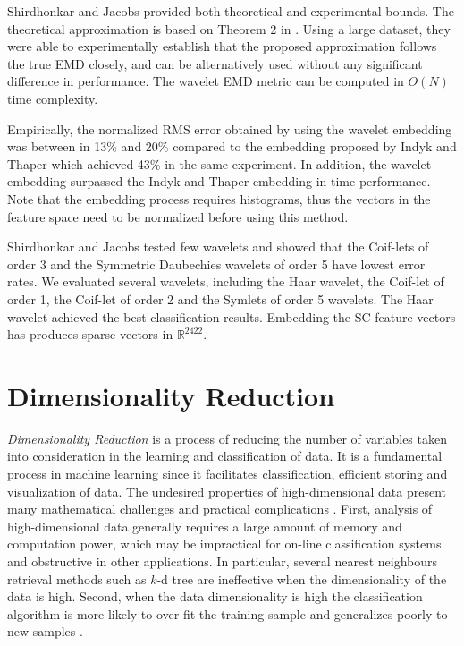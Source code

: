 \iftoggle{edit-mode}{\hspace{0pt}\marginpar{shirdhonkar - theoretical and empirical bounds}}{}
Shirdhonkar and Jacobs provided both theoretical and experimental bounds. 
The theoretical approximation is based on Theorem 2 in \cite{shirdhonkar2008approximate}. 
Using a large dataset, they were able to experimentally establish that the proposed approximation follows the true EMD closely, and can be alternatively used without any significant difference in performance. 
The wavelet EMD metric can be computed in $O\left( N \right)$ time complexity. 

\iftoggle{edit-mode}{\hspace{0pt}\marginpar{Performance - Indyk vs. shirdhonkar}}{}
Empirically, the normalized RMS error obtained by using the wavelet embedding was between in 13\% and 20\% compared to the embedding proposed by Indyk and Thaper which achieved 43\% in the same experiment. 
In addition, the wavelet embedding surpassed the Indyk and Thaper embedding in time performance.
Note that the embedding process requires histograms, thus the vectors in the feature space need to be normalized before using this method.

Shirdhonkar and Jacobs tested few wavelets and showed that the Coif-lets of order 3 and the Symmetric Daubechies wavelets of order 5 have lowest error rates. 
We evaluated several wavelets, including the Haar wavelet, the Coif-let of order 1, the Coif-let of order 2 and the Symlets of order 5 wavelets.
The Haar wavelet achieved the best classification results.
Embedding the SC feature vectors has produces sparse vectors in $\mathds{R}^2422$.

 
\newpage{}

\section{Dimensionality Reduction}
\label{sec:dr}

\iftoggle{edit-mode}{\hspace{0pt}\marginpar{What is DR and what techniques are there?}}{}
\emph{Dimensionality Reduction} is a process of reducing the number of variables taken into consideration in the learning and classification of data. 
It is a fundamental process in machine learning since it facilitates classification, efficient storing and visualization of data. 
The undesired properties of high-dimensional data present many mathematical challenges and practical complications \cite{van2009dimensionality}. 
First, analysis of high-dimensional data generally requires a large amount of memory and computation power, which may be impractical for on-line classification systems and obstructive in other applications. 
In particular, several nearest neighbours retrieval methods such as $k$-d tree are ineffective when the dimensionality of the data is high.
Second, when the data dimensionality is high the classification algorithm is more likely to over-fit the training sample and generalizes poorly to new samples \cite{aida2009word}.

